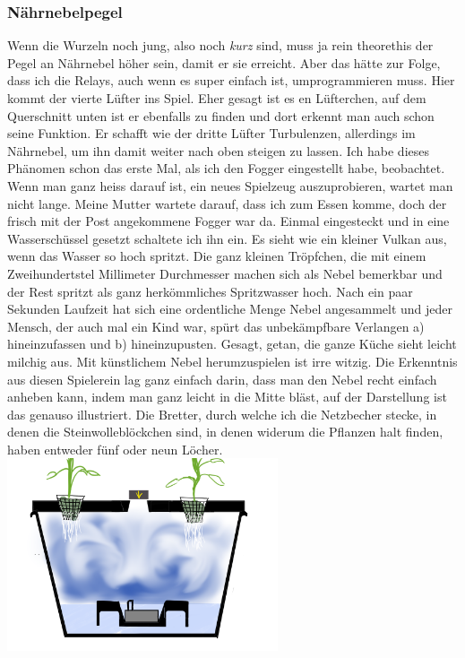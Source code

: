 \documentclass[12pt,titlepage,a4paper]{article}
\begin{document}
\subsubsection{Nährnebelpegel}
Wenn die Wurzeln noch jung, also noch \textit{kurz} sind, muss ja rein theorethis der Pegel an Nährnebel höher sein, damit er sie erreicht. Aber das hätte zur Folge, dass ich die Relays, auch wenn es super einfach ist, umprogrammieren muss. Hier kommt der vierte Lüfter ins Spiel. Eher gesagt ist es en Lüfterchen, auf dem Querschnitt unten ist er ebenfalls zu finden und dort erkennt man auch schon seine Funktion. Er schafft wie der dritte Lüfter Turbulenzen, allerdings im Nährnebel, um ihn damit weiter nach oben steigen zu lassen. Ich habe dieses Phänomen schon das erste Mal, als ich den Fogger eingestellt habe, beobachtet. Wenn man ganz heiss darauf ist, ein neues Spielzeug auszuprobieren, wartet man nicht lange. Meine Mutter wartete darauf, dass ich zum Essen komme, doch der frisch mit der Post angekommene Fogger war da. Einmal eingesteckt und in eine Wasserschüssel gesetzt schaltete ich ihn ein. Es sieht wie ein kleiner Vulkan aus, wenn das Wasser so hoch spritzt. Die ganz kleinen Tröpfchen, die mit einem Zweihundertstel Millimeter Durchmesser machen sich als Nebel bemerkbar und der Rest spritzt als ganz herkömmliches Spritzwasser hoch. Nach ein paar Sekunden Laufzeit hat sich eine ordentliche Menge Nebel angesammelt und jeder Mensch, der auch mal ein Kind war, spürt das unbekämpfbare Verlangen a) hineinzufassen und b) hineinzupusten. Gesagt, getan, die ganze Küche sieht leicht milchig aus. Mit künstlichem Nebel herumzuspielen ist irre witzig. Die Erkenntnis aus diesen Spielerein lag ganz einfach darin, dass man den Nebel recht einfach anheben kann, indem man ganz leicht in die Mitte bläst, auf der Darstellung ist das genauso illustriert. Die Bretter, durch welche ich die Netzbecher stecke, in denen die Steinwolleblöckchen sind, in denen widerum die Pflanzen halt finden, haben entweder fünf oder neun Löcher. 
\includegraphics[width=8cm]{Querschnitt}
\end{document}

